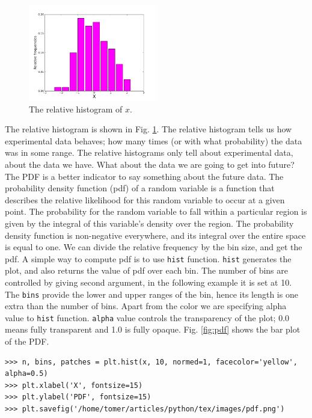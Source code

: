 \documentclass[10pt]{book}
\begin{document}
{\beforefig
\begin{figure}[h!]
  \centering
    \includegraphics[width=0.5\textwidth]{images/relfreq.png}
  \caption{The relative histogram of $x$.}
   \label{fig:rf}
\end{figure}
\afterfig

The relative histogram is shown in Fig. \ref{fig:rf}. The relative histogram tells us how experimental data behaves; how many times (or with what probability) the data was in some range. The relative histograms only tell about experimental data, about the data we have. What about the data we are going to get into future? The PDF is a better indicator to say something about the future data. The probability density function (pdf) of a random variable is a function that describes the relative likelihood for this random variable to occur at a given point. The probability for the random variable to fall within a particular region is given by the integral of this variable’s density over the region. The probability density function is non-negative everywhere, and its integral over the entire space is equal to one. We can divide the relative frequency by the bin size, and get the pdf. A simple way to compute pdf is to use \verb"hist" function. \verb"hist" generates the plot, and also returns the value of pdf over 
each bin. The number of bins are controlled by giving second argument, in the following example it is set at 10. The \verb"bins" provide the lower and upper ranges of the bin, hence its length is one extra than the number of bins. Apart from the color we are specifying alpha value to \verb"hist" function. \verb"alpha" value controls the transparency of the plot; 0.0 means fully transparent and 1.0 is fully opaque. Fig. \ref{fig:pdf} shows the bar plot of the PDF. 
\beforeverb \begin{verbatim}
>>> n, bins, patches = plt.hist(x, 10, normed=1, facecolor='yellow', alpha=0.5)
>>> plt.xlabel('X', fontsize=15)
>>> plt.ylabel('PDF', fontsize=15)
>>> plt.savefig('/home/tomer/articles/python/tex/images/pdf.png')
\end{verbatim}
\afterverb

}
\end{document}
